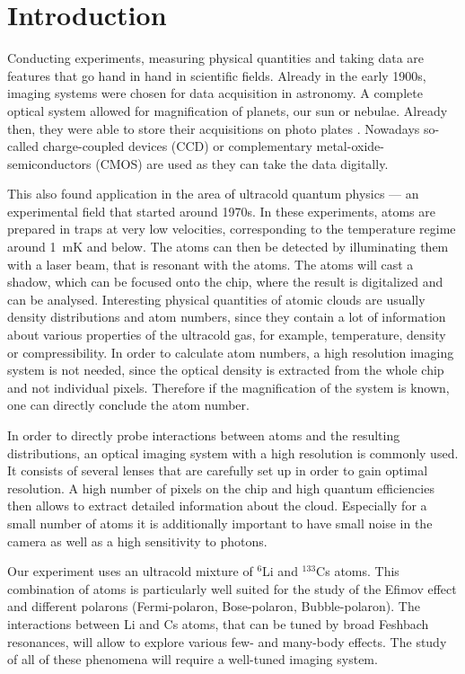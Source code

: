 \chapter{Introduction}
Conducting experiments, measuring physical quantities and taking data are features that go hand in hand in scientific fields. Already in the early 1900s, imaging systems were chosen for data acquisition in astronomy. A complete optical system allowed for magnification of planets, our sun or nebulae. Already then, they were able to store their acquisitions on photo plates \cite{hdaplates}. Nowadays so-called charge-coupled devices (CCD) or complementary metal-oxide-semiconductors (CMOS) are used as they can take the data digitally.

This also found application in the area of ultracold quantum physics --- an experimental field that started around 1970s. In these experiments, atoms are prepared in traps at very low velocities, corresponding to the temperature regime around \SI{1}{\milli\kelvin} and below. The atoms can then be detected by illuminating them with a laser beam, that is resonant with the atoms. The atoms will cast a shadow, which can be focused onto the chip, where the result is digitalized and can be analysed. Interesting physical quantities of atomic clouds are usually density distributions and atom numbers, since they contain a lot of information about various properties of the ultracold gas, for example, temperature, density or compressibility. In order to calculate atom numbers, a high resolution imaging system is not needed, since the optical density is extracted from the whole chip and not individual pixels. Therefore if the magnification of the system is known, one can directly conclude the atom number.

In order to directly probe interactions between atoms and the resulting distributions, an optical imaging system with a high resolution is commonly used. It consists of several lenses that are carefully set up in order to gain optimal resolution. A high number of pixels on the chip and high quantum efficiencies then allows to extract detailed information about the cloud. Especially for a small number of atoms it is additionally important to have small noise in the camera as well as a high sensitivity to photons.

Our experiment uses an ultracold mixture of $^6$Li and $^{133}$Cs atoms. This combination of atoms is particularly well suited for the study of the Efimov effect \cite{Pires2014,Ulmanis2015,Ulmanis2016} and different polarons\cite{Blinova2013,Massignan2014,Devreese2009} (Fermi-polaron, Bose-polaron, Bubble-polaron). The interactions between Li and Cs atoms, that can be tuned by broad Feshbach resonances, will allow to explore various few- and many-body effects. The study of all of these phenomena will require a well-tuned imaging system.


